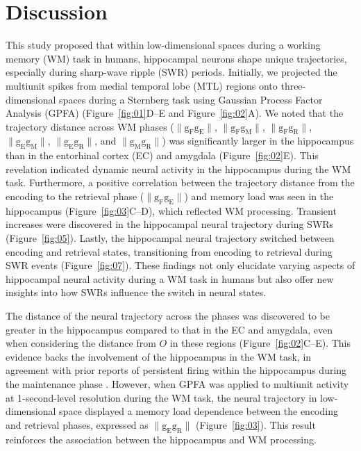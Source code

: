 \section{Discussion}
This study proposed that within low-dimensional spaces during a working memory (WM) task in humans, hippocampal neurons shape unique trajectories, especially during sharp-wave ripple (SWR) periods. Initially, we projected the multiunit spikes from medial temporal lobe (MTL) regions onto three-dimensional spaces during a Sternberg task using Gaussian Process Factor Analysis (GPFA) (Figure~\ref{fig:01}D--E and Figure~\ref{fig:02}A). We noted that the trajectory distance across WM phases ($\mathrm{\lVert g_{F}g_{E} \rVert}$, $\mathrm{\lVert g_{F}g_{M} \rVert}$, $\mathrm{\lVert g_{F}g_{R} \rVert}$, $\mathrm{\lVert g_{E}g_{M} \rVert}$, $\mathrm{\lVert g_{E}g_{R} \rVert}$, and $\mathrm{\lVert g_{M}g_{R} \rVert}$) was significantly larger in the hippocampus than in the entorhinal cortex (EC) and amygdala (Figure~\ref{fig:02}E). This revelation indicated dynamic neural activity in the hippocampus during the WM task. Furthermore, a positive correlation between the trajectory distance from the encoding to the retrieval phase ($\mathrm{\lVert g_{F}g_{E} \rVert}$) and memory load was seen in the hippocampus (Figure~\ref{fig:03}C--D), which reflected WM processing. Transient increases were discovered in the hippocampal neural trajectory during SWRs (Figure~\ref{fig:05}). Lastly, the hippocampal neural trajectory switched between encoding and retrieval states, transitioning from encoding to retrieval during SWR events (Figure~\ref{fig:07}). These findings not only elucidate varying aspects of hippocampal neural activity during a WM task in humans but also offer new insights into how SWRs influence the switch in neural states.

The distance of the neural trajectory across the phases was discovered to be greater in the hippocampus compared to that in the EC and amygdala, even when considering the distance from $O$ in these regions (Figure~\ref{fig:02}C--E). This evidence backs the involvement of the hippocampus in the WM task, in agreement with prior reports of persistent firing within the hippocampus during the maintenance phase \cite{boran_persistent_2019} \cite{kaminski_persistently_2017} \cite{kornblith_persistent_2017} \cite{faraut_dataset_2018}. However, when GPFA was applied to multiunit activity at 1-second-level resolution during the WM task, the neural trajectory in low-dimensional space displayed a memory load dependence between the encoding and retrieval phases, expressed as $\mathrm{\lVert g_{E}g_{R} \rVert}$ (Figure~\ref{fig:03}). This result reinforces the association between the hippocampus and WM processing.

